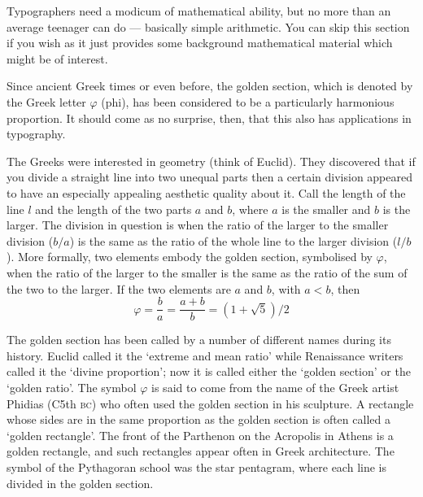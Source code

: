 \documentclass[10pt,a4paper,oneside,extrafontsizes]{memoir}%
\begin{document}
\begin{paracol}{2}
\switchEng
    Typographers need a modicum of mathematical ability, but no more
than an average teenager can do --- basically simple arithmetic. You can
skip this section if you wish as it just provides some background 
mathematical material which might be of interest.

    Since ancient Greek times or even before, the golden section, which
is denoted by the Greek letter $\varphi$ (phi), has been considered to be
a particularly harmonious proportion. It should come as no surprise, then,
that this also has applications in typography.

    The Greeks were interested in geometry (think of Euclid). They discovered
that if you divide a straight line into two unequal parts then a certain
division appeared to have an especially appealing aesthetic quality about it. 
Call the length of the line $l$ and the length of the two parts $a$ and $b$, 
where $a$ is the smaller and $b$ is the larger. The division in question
is when the ratio of the larger to the smaller division ($b/a$) is the same
as the ratio of the whole line to the larger division ($l/b$).
More formally, two elements embody the golden section, symbolised by
$\varphi$, when the ratio of the larger
to the smaller is the same as the ratio of the sum of the two to the larger.
If the two elements are $a$ and $b$, with $a < b$, then
\begin{equation}
\varphi = \frac{b}{a} = \frac{a+b}{b} = (1+\sqrt{5})/2
\end{equation}

    The golden section has been called by a number of different names
during its history. Euclid
 called it the `extreme and mean ratio' while
Renaissance writers called it the `divine proportion'; now it is
called either the `golden section' or the `golden ratio'. The symbol
$\varphi$ is said to come from the name of the Greek artist 
Phidias
(C5th \textsc{bc}) who often used the golden section in his sculpture.
A rectangle whose sides are in the same proportion as the golden section
is often called a `golden rectangle'.
The front of the Parthenon on the Acropolis in Athens is a golden rectangle,
and such rectangles appear often in Greek architecture.
The symbol of the Pythagoran school was the star pentagram, 
where each line is divided in the golden section.



\end{paracol}
\end{document}
